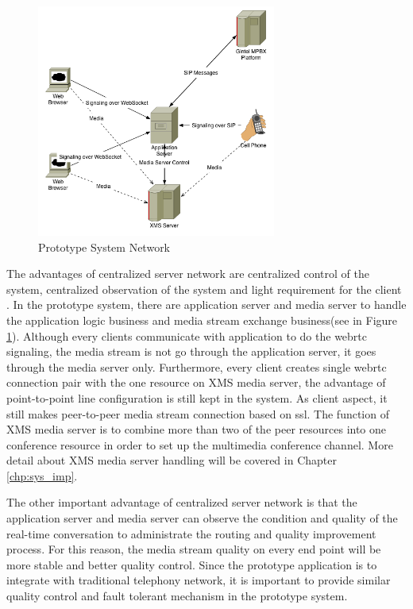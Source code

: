 \begin{figure}
	\centering
    	\includegraphics[width=0.70\textwidth,natwidth=610,natheight=642]{figs/system_network.png}
  	\caption{Prototype System Network}
  	\label{fig:system_network}
\end{figure}

\par The advantages of centralized server network are centralized control of the system, centralized observation of the system and light requirement for the client . In the prototype system, there are application server and media server to handle the application logic business and media stream exchange business(see in Figure \ref{fig:system_network}). Although every clients communicate with application to do the \gls{webrtc} signaling, the media stream is not go through the application server, it goes through the media server only. Furthermore, every client creates single \gls{webrtc} connection pair with the one resource on XMS media server, the advantage of point-to-point line configuration is still kept in the system. As client aspect, it still makes peer-to-peer media stream connection based on \gls{ssl}. The function of XMS media server is to combine more than two of the peer resources into one conference resource in order to set up the multimedia conference channel. More detail about XMS media server handling will be covered in Chapter \ref{chp:sys_imp}.

\par The other important advantage of centralized server network is that the application server and media server can observe the condition and quality of the real-time conversation to administrate the routing and quality improvement process. For this reason, the media stream quality on every end point will be more stable and better quality control. Since the prototype application is to integrate with traditional telephony network, it is important to provide similar quality control and fault tolerant mechanism in the prototype system.

